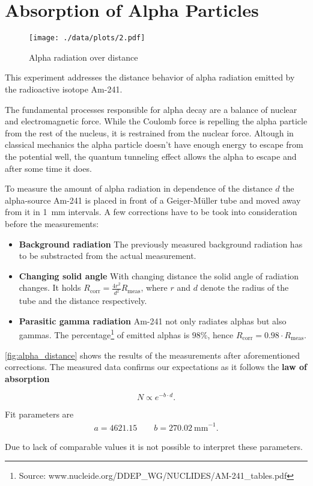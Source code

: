 \chapter{Absorption of Alpha Particles}
\begin{figure}[ht!]
	\centering
	\texttt{[image: ./data/plots/2.pdf]}
	\caption[Alpha radiation over distance]{Alpha radiation over distance}
	\label{fig:alpha_distance}
\end{figure}

This experiment addresses the distance behavior of alpha radiation emitted by the radioactive isotope Am-241.

The fundamental processes responsible for alpha decay are a balance of nuclear and electromagnetic force.
While the Coulomb force is repelling the alpha particle from the rest of the nucleus, it is restrained from the nuclear force.
Altough in classical mechanics the alpha particle doesn't have enough energy to escape from the potential well, the quantum tunneling effect allows the alpha to escape and after some time it does.

To measure the amount of alpha radiation in dependence of the distance $d$ the alpha-source Am-241 is placed in front of a Geiger-Müller tube and moved away from it in \SI{1}{\milli\meter} intervals.
A few corrections have to be took into consideration before the measurements:
\begin{itemize}
	\item \textbf{Background radiation} The previously measured background radiation has to be substracted from the actual measurement.
	\item \textbf{Changing solid angle} With changing distance the solid angle of radiation changes. It holds $R_\text{corr}=\frac{4r^2}{d^2}R_\text{meas}$, where $r$ and $d$ denote the radius of the tube and the distance respectively.
	\item \textbf{Parasitic gamma radiation} Am-241 not only radiates alphas but also gammas. The percentage\footnote{Source: www.nucleide.org/DDEP\_WG/NUCLIDES/AM-241\_tables.pdf} of emitted alphas is $\num{98}\%$, hence $R_\text{corr}=0.98\cdot R_\text{meas}$.
\end{itemize}

\autoref{fig:alpha_distance} shows the results of the measurements after aforementioned corrections.
The measured data confirms our expectations as it follows the \textbf{law of absorption}

\begin{equation*}
	N\propto e^{-b\cdot d}.
\end{equation*}

Fit parameters are
\begin{gather*}
	a=4621.15\qquad b=\SI{270.02}{\milli\meter}^{-1}.
\end{gather*}

Due to lack of comparable values it is not possible to interpret these parameters.  
